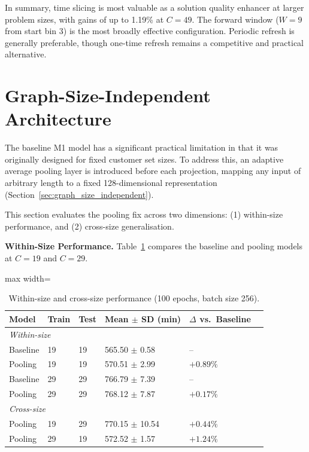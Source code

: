In summary, time slicing is most valuable as a solution quality enhancer at larger problem
sizes, with gains of up to 1.19\% at $C = 49$. The forward window ($W = 9$ from start
bin 3) is the most broadly effective configuration. Periodic refresh is generally preferable,
though one-time refresh remains a competitive and practical alternative.


\section{Graph-Size-Independent Architecture}
\label{sec:graph_size_indep}

The baseline M1 model has a significant practical limitation in that it was originally
designed for fixed customer set sizes. To address this, an adaptive average pooling layer is
introduced before each projection, mapping any input of arbitrary length to a fixed
128-dimensional representation (Section~\ref{sec:graph_size_independent}).

This section evaluates the pooling fix across two dimensions: (1) within-size performance,
and (2) cross-size generalisation.

\textbf{Within-Size Performance.} Table~\ref{tab:pooling_combined} compares the baseline and pooling models at $C = 19$ and
$C = 29$.

\begin{table}[H]
\centering
\caption{Within-size and cross-size performance (100 epochs, batch size 256).}
\label{tab:pooling_combined}
\begin{adjustbox}{max width=\textwidth}
\begin{tabular}{llllll}
\toprule
\textbf{Model} & \textbf{Train} & \textbf{Test}
    & \textbf{Mean $\pm$ SD (min)} & \textbf{$\Delta$ vs.\ Baseline} \\
\midrule
\multicolumn{4}{l}{\textit{Within-size}} & \\
Baseline & 19 & 19 & 565.50 $\pm$ 0.58 & -- \\
Pooling  & 19 & 19 & 570.51 $\pm$ 2.99 & $+0.89\%$ \\
Baseline & 29 & 29 & 766.79 $\pm$ 7.39 & -- \\
Pooling  & 29 & 29 & 768.12 $\pm$ 7.87 & $+0.17\%$ \\
\multicolumn{4}{l}{\textit{Cross-size}} & \\
Pooling  & 19 & 29 & 770.15 $\pm$ 10.54 & $+0.44\%$ \\
Pooling  & 29 & 19 & 572.52 $\pm$ 1.57  & $+1.24\%$ \\
\bottomrule
\end{tabular}
\end{adjustbox}
\end{table}


